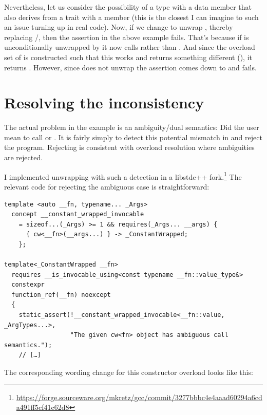 Nevertheless, let us consider the possibility of a type with a data member that also derives from a
trait with a   member (this is the closest I can imagine to such
an issue turning up in real code).
Now, if we change  to unwrap , thereby replacing
/, then the assertion in the above example fails.
That's because if  is unconditionally unwrapped by  it now
calls  rather than .
And since the overload set of  is constructed such that this works and returns something
different (), it returns .
However, since  does not unwrap  the assertion comes
down to  and fails.

\section{Resolving the inconsistency}

The actual problem in the \cite{P3792R0} example is an ambiguity/dual semantics: Did the user mean
to call  or .
It is fairly simply to detect this potential mismatch in  and reject the program.
Rejecting is consistent with overload resolution where ambiguities are rejected.

I implemented  unwrapping  with such a detection in a
libstdc++ fork.\footnote{%
\url{https://forge.sourceware.org/mkretz/gcc/commit/3277bbbc4e4aaad60294a6cda491ff5cf41c62d8}}
The relevant code for rejecting the ambiguous case is straightforward:
\medskip\begin{lstlisting}[style=Vc]
template <auto __fn, typename... _Args>
  concept __constant_wrapped_invocable
    = sizeof...(_Args) >= 1 && requires(_Args... __args) {
      { cw<__fn>(__args...) } -> _ConstantWrapped;
    };

template<_ConstantWrapped __fn>
  requires __is_invocable_using<const typename __fn::value_type&>
  constexpr
  function_ref(__fn) noexcept
  {
    static_assert(!__constant_wrapped_invocable<__fn::value, _ArgTypes...>,
                  "The given cw<fn> object has ambiguous call semantics.");
    // […]
\end{lstlisting}

The corresponding wording change for this constructor overload looks like this:

